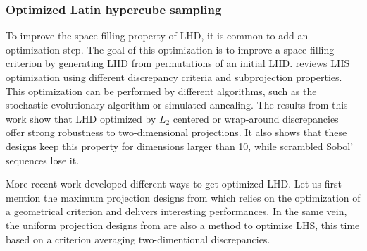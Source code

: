 \subsubsection{Optimized Latin hypercube sampling}
To improve the space-filling property of LHD, it is common to add an optimization step. 
The goal of this optimization is to improve a space-filling criterion by generating LHD from permutations of an initial LHD.
\citet{damblin_couplet_2013} reviews LHS optimization using different discrepancy criteria and subprojection properties.
This optimization can be performed by different algorithms, such as the stochastic evolutionary algorithm or simulated annealing.
The results from this work show that LHD optimized by $L_2$ centered or wrap-around discrepancies offer strong robustness to two-dimensional projections.
It also shows that these designs keep this property for dimensions larger than 10, while scrambled Sobol' sequences lose it. 

More recent work developed different ways to get optimized LHD. 
Let us first mention the maximum projection designs from \citet{joseph_gul_2015} which relies on the optimization of a geometrical criterion and delivers interesting performances. 
In the same vein, the uniform projection designs from \citet{sun_2019} are also a method to optimize LHS, this time based on a criterion averaging two-dimentional discrepancies.

